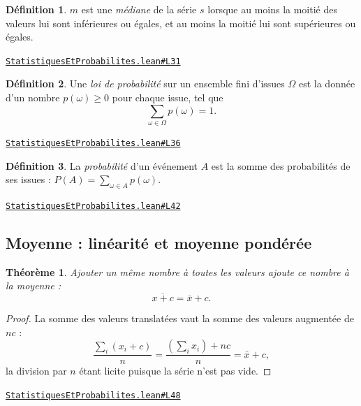 \documentclass[11pt,a4paper]{article}
\theoremstyle{definition}
\newtheorem{definition}{Définition}
\theoremstyle{plain}
\newtheorem{theoreme}{Théorème}
\newcommand{\source}[2]{\par\smallskip\noindent\hfill{\footnotesize\href{#1}{\texttt{#2}}}\par\smallskip}
\begin{document}
\begin{definition}
$m$ est une \emph{médiane} de la série $s$ lorsque au moins la moitié des valeurs lui
sont inférieures ou égales, et au moins la moitié lui sont supérieures ou égales.
\end{definition}
\source{https://github.com/Commutator-IO/learn-lean/blob/main/courses/01-college/06-statistiques-et-probabilites/StatistiquesEtProbabilites.lean\#L31}{StatistiquesEtProbabilites.lean\#L31}

\begin{definition}
Une \emph{loi de probabilité} sur un ensemble fini d'issues $\Omega$ est la donnée
d'un nombre $p(\omega) \ge 0$ pour chaque issue, tel que
\[ \sum_{\omega \in \Omega} p(\omega) = 1 . \]
\end{definition}
\source{https://github.com/Commutator-IO/learn-lean/blob/main/courses/01-college/06-statistiques-et-probabilites/StatistiquesEtProbabilites.lean\#L36}{StatistiquesEtProbabilites.lean\#L36}

\begin{definition}
La \emph{probabilité} d'un événement $A$ est la somme des probabilités de ses issues :
$P(A) = \sum_{\omega \in A} p(\omega)$.
\end{definition}
\source{https://github.com/Commutator-IO/learn-lean/blob/main/courses/01-college/06-statistiques-et-probabilites/StatistiquesEtProbabilites.lean\#L42}{StatistiquesEtProbabilites.lean\#L42}

\subsection{Moyenne : linéarité et moyenne pondérée}

\begin{theoreme}
Ajouter un même nombre à toutes les valeurs ajoute ce nombre à la moyenne :
\[ \overline{x + c} = \bar{x} + c . \]
\end{theoreme}

\begin{proof}
La somme des valeurs translatées vaut la somme des valeurs augmentée de $nc$ :
\[ \frac{\sum_i (x_i + c)}{n} = \frac{\left(\sum_i x_i\right) + nc}{n}
   = \bar{x} + c , \]
la division par $n$ étant licite puisque la série n'est pas vide.
\end{proof}
\source{https://github.com/Commutator-IO/learn-lean/blob/main/courses/01-college/06-statistiques-et-probabilites/StatistiquesEtProbabilites.lean\#L48}{StatistiquesEtProbabilites.lean\#L48}
\end{document}
